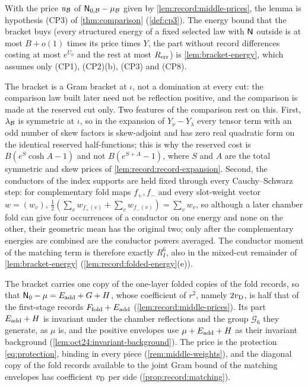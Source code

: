 With the price $u_{\mathcal B}$ of $\mathsf N_{0,\mathcal B}-\mu_{\mathcal B}$ given by
\cref{lem:record:middle-prices}, the lemma is hypothesis (CP3) of
\cref{thm:comparison} (\cref{def:cp3}). The
energy bound that the bracket buys (every structured energy of a
fixed selected law with $\mathsf N$ outside is at most $B+o(1)$ times its price times
$Y$, the part without record differences costing at most $e^{U_0}$ and the
rest at most $R_{\rm err}$) is \cref{lem:bracket-energy}, which assumes only
(CP1), (CP2)(b), (CP3) and (CP8).

\begin{remark}\label{rem:middle-bracket}
The bracket is a Gram bracket at $\iota$, not a domination at every cut: the
comparison law built later need not be reflection positive, and the comparison
is made at the reserved cut only. Two features of the comparison rest on
this. First, $\lambda_{\mathcal B}$ is symmetric at $\iota$, so in the expansion of
$Y_\nu-Y_\lambda$ every tensor term with an odd number of skew factors is
skew-adjoint and has zero real quadratic form on the identical reserved
half-functions; this is why the reserved cost is $B(e^S\cosh A-1)$ and not
$B(e^{S+A}-1)$, where $S$ and $A$ are the total symmetric and skew prices of \cref{lem:record:record-expansion}. Second, the conductors
of the index supports are held fixed through every Cauchy--Schwarz step:
for complementary fold maps $f_+,f_-$ and every slot-weight vector $w=(w_v)$,
$\frac12(\sum_vw_{f_+(v)}+\sum_vw_{f_-(v)})=\sum_vw_v$, so although a later
chamber fold can give four occurrences of a conductor on one energy and
none on the other, their geometric mean has the original two; only after the
complementary energies are combined are the conductor powers averaged. The
conductor moment of the matching term is therefore exactly $R_I^6$, also in
the mixed-cut remainder of \cref{lem:bracket-energy}
(\cref{lem:record:folded-energy}(e)).

The bracket carries one copy of the one-layer folded copies of the fold records, so that
$\mathsf N_0-\mu=E_{\rm add}+G+H$, whose coefficient of $r^2$, namely $2v_{\rm D}$, is half
that of the first-stage records $F_{\rm fold}+E_{\rm add}$
(\cref{lem:record:middle-prices}). Its part $E_{\rm add}+H$ is invariant under
the chamber reflections and the group $\mathcal G_6$ they generate, as $\mu$
is, and the positive envelopes use $\mu+E_{\rm add}+H$ as their invariant
background (\cref{lem:oct24:invariant-background}). The price is the
protection \eqref{eq:protection}, binding in every piece
(\cref{rem:middle-weights}), and the diagonal copy of the fold
records available to the joint Gram bound of the matching
envelopes has coefficient $v_{\rm D}$ per side
(\cref{prop:record:matching}).
\end{remark}

